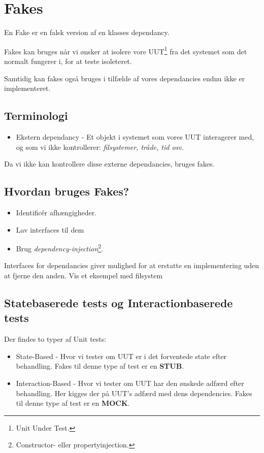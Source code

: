 \section{Fakes}

En Fake er en falsk version af en klasses dependancy.

Fakes kan bruges når vi ønsker at isolere vore UUT\footnote{Unit Under Test.} fra det systemet som det normalt fungerer i, for at teste isoleteret.

Samtidig kan fakes også bruges i tilfælde af vores dependancies endnu ikke er implementeret.

\subsection{Terminologi}
\begin{itemize}
	\item Ekstern dependancy - Et objekt i systemet som vores UUT interagerer med, og som vi ikke kontrollerer: \textit{filsystemer, tråde, tid osv.}
\end{itemize}

Da vi ikke kan kontrollere disse externe dependancies, bruges fakes.

\subsection{Hvordan bruges Fakes?}

\begin{itemize}
	\item Identificér afhængigheder.
	\item Lav interfaces til dem
	\item Brug \textit{dependency-injection}\footnote{Constructor- eller propertyinjection.}.
\end{itemize}

Interfaces for dependancies giver mulighed for at erstatte en implementering uden at fjerne den anden. Vis et eksempel med filsystem

\subsection{Statebaserede tests og Interactionbaserede tests}
Der findes to typer af Unit tests:

\begin{itemize}
	\item State-Based - Hvor vi tester om UUT er i det forventede state efter behandling. Fakes til denne type af test er en \textbf{STUB}.
	\item Interaction-Based - Hvor vi tester om UUT har den ønskede adfærd efter behandling. Her kigges der på UUT's adfærd med dens dependencies. Fakes til denne type af test er en \textbf{MOCK}.
\end{itemize}

